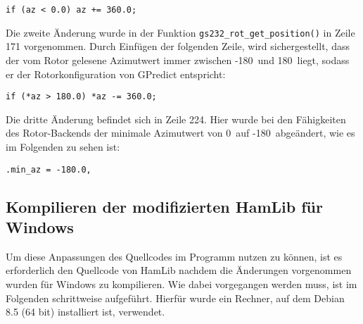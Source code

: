 \vspace{-1em}
\begin{shaded}
	\normalsize{\texttt{if (az < 0.0) az += 360.0;}}
\end{shaded}
\vspace{-1em}

Die zweite Änderung wurde in der Funktion \texttt{gs232\_rot\_get\_position()} in Zeile 171 vorgenommen. Durch Einfügen der folgenden Zeile, wird sichergestellt, dass der vom Rotor gelesene Azimutwert immer zwischen -180\mydegree\ und 180\mydegree\ liegt, sodass er der Rotorkonfiguration von GPredict entspricht:

\vspace{-1em}
\begin{shaded}
	\normalsize{\texttt{if (*az > 180.0) *az -= 360.0;}}
\end{shaded}
\vspace{-1em}

Die dritte Änderung befindet sich in Zeile 224. Hier wurde bei den Fähigkeiten des Rotor-Backends der minimale Azimutwert von 0\mydegree\ auf -180\mydegree\ abgeändert, wie es im Folgenden zu sehen ist:

\vspace{-1em}
\begin{shaded}
	\normalsize{\texttt{.min\_az = -180.0,}}
\end{shaded}

\subsection{Kompilieren der modifizierten HamLib für Windows}
\label{chap:winbuild}

Um diese Anpassungen des Quellcodes im Programm  nutzen zu können, ist es erforderlich den Quellcode von HamLib nachdem die Änderungen vorgenommen wurden für Windows zu kompilieren. Wie dabei vorgegangen werden muss, ist im Folgenden schrittweise aufgeführt. Hierfür wurde ein Rechner, auf dem Debian 8.5 (64 bit) installiert ist, verwendet.

